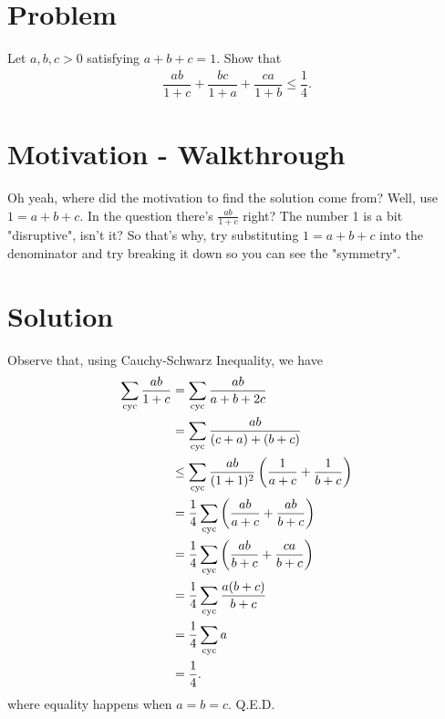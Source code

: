 \section{Problem}
Let $a,b,c > 0$ satisfying $a+b+c=1$. Show that
\begin{align*}
\dfrac{ab}{1+c}+\dfrac{bc}{1+a}+\dfrac{ca}{1+b} \le \dfrac{1}{4}.
\end{align*}

\newpage
\section{Motivation - Walkthrough}
Oh yeah, where did the motivation to find the solution come from? Well, use $1=a+b+c$. In the question there's $\frac{ab}{1+c}$ right? The number 1 is a bit "disruptive", isn't it? So that's why, try substituting $1=a+b+c$ into the denominator and try breaking it down so you can see the "symmetry".

\newpage
\section{Solution}

    Observe that, using Cauchy-Schwarz Inequality, we have
    \begin{align*}
        \sum_{\mathrm{cyc}} \dfrac{ab}{1+c} &= \sum_{\mathrm{cyc}} \dfrac{ab}{a+b+2c}\\
        &= \sum_{\mathrm{cyc}} \dfrac{ab}{(c+a)+(b+c)}\\
        &\le \sum_{\mathrm{cyc}} \dfrac{ab}{(1+1)^2}\left(\dfrac{1}{a+c} + \dfrac{1}{b+c}\right)\\
        &= \dfrac{1}{4} \sum_{\mathrm{cyc}} \left(\dfrac{ab}{a+c} + \dfrac{ab}{b+c}\right)\\
        &= \dfrac{1}{4}\sum_{\mathrm{cyc}} \left(\dfrac{ab}{b+c}+\dfrac{ca}{b+c}\right)\\
        &= \dfrac{1}{4}\sum_{\mathrm{cyc}} \dfrac{a(b+c)}{b+c}\\
        &= \dfrac{1}{4}\sum_{\mathrm{cyc}} a\\
        &= \dfrac{1}{4}.
    \end{align*}
    where equality happens when $a=b=c$. Q.E.D.
